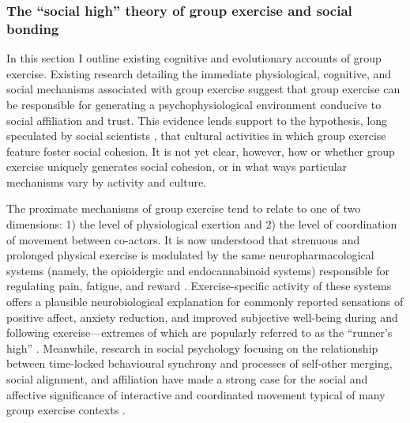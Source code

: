 \subsubsection{The ``social high'' theory of group exercise and social bonding}

In this section I outline existing cognitive and evolutionary accounts of group exercise.  Existing research detailing the immediate physiological, cognitive, and social mechanisms associated with group exercise suggest that group exercise can be responsible for generating a psychophysiological environment conducive to social affiliation and trust.  This evidence lends support to the hypothesis, long speculated by social scientists \citep[see, for example][]{Durkheim1965}, that cultural activities in which group exercise feature foster social cohesion.  It is not yet clear, however, how or whether group exercise uniquely generates social cohesion, or in what ways particular mechanisms vary by activity and culture.


The proximate mechanisms of group exercise tend to relate to one of two dimensions: 1) the level of physiological exertion and
2) the level of coordination of movement between co-actors.  It is now understood that strenuous and prolonged physical exercise is modulated by the same neuropharmacological systems (namely, the opioidergic and endocannabinoid systems) responsible for regulating pain, fatigue, and reward \citep{Boecker2008,Raichlen2013}.  Exercise-specific activity of these systems offers a plausible neurobiological explanation for commonly reported sensations of positive affect, anxiety reduction, and improved subjective well-being during and following exercise---extremes of which are popularly referred to as the ``runner's high'' \citep{(Dietrich2004,Boecker2008,Raichlen2012}.  Meanwhile, research in social psychology focusing on the relationship between time-locked behavioural synchrony and processes of self-other merging, social alignment, and affiliation have made a strong case for the social and affective significance of interactive and coordinated movement typical of many group exercise contexts \cite{Wiltermuth2009,Kirschner2010,Reddish2013,Tuncgenc2016}.

